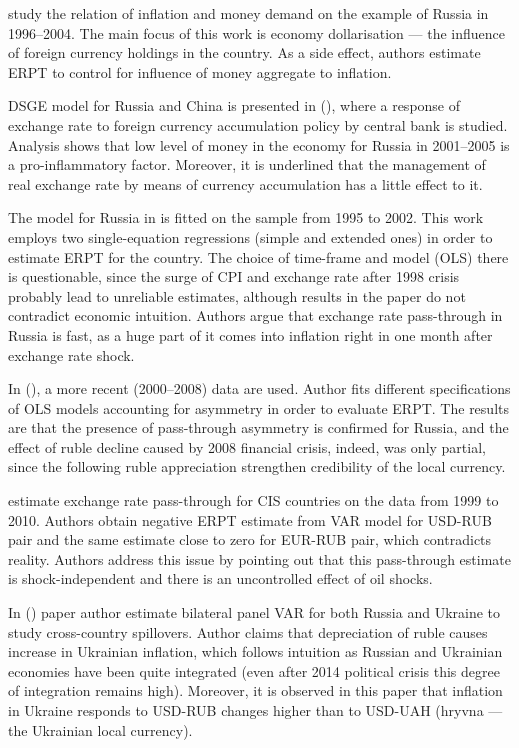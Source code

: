 \documentclass[12pt, a4paper]{extarticle}
\begin{document}
\textcite{Oomes2005} study the relation of inflation and money demand on the example of Russia in 1996--2004. The main focus of this work is economy dollarisation --- the influence of foreign currency holdings in the country. As a side effect, authors estimate ERPT to control for influence of money aggregate to inflation. 

DSGE model for Russia and China is presented in (\cite{Sosunov2006}), where a response of exchange rate to foreign currency accumulation policy by central bank is studied. Analysis shows that low level of money in the economy for Russia in 2001--2005 is a pro-inflammatory factor. Moreover, it is underlined that the management of real exchange rate by means of currency accumulation has a little effect to it.

The model for Russia in \cite{Dobrynskaya2008} is fitted on the sample from 1995 to 2002. This work employs two single-equation regressions (simple and extended ones) in order to estimate ERPT for the country. The choice of time-frame and model (OLS) there is questionable, since the surge of CPI and exchange rate after 1998 crisis probably lead to unreliable estimates, although results in the paper do not contradict economic intuition. Authors argue that exchange rate pass-through in Russia is fast, as a huge part of it comes into inflation right in one month after exchange rate shock.

In (\cite{Kataranova2010}), a more recent (2000--2008) data are used. Author fits different specifications of OLS models accounting for asymmetry in order to evaluate ERPT. The results are that the presence of pass-through asymmetry is confirmed for Russia, and the effect of ruble decline caused by 2008 financial crisis, indeed, was only partial, since the following ruble appreciation strengthen credibility of the local currency.

\textcite{Beckmann2013} estimate exchange rate pass-through for CIS countries on the data from 1999 to 2010. Authors obtain negative ERPT estimate from VAR model for USD-RUB pair and the same estimate close to zero for EUR-RUB pair, which contradicts reality. Authors address this issue by pointing out that this pass-through estimate is shock-independent and there is an uncontrolled effect of oil shocks.

In (\cite{Faryna2016}) paper author estimate bilateral panel VAR for both Russia and Ukraine to study cross-country spillovers. Author claims that depreciation of ruble causes increase in Ukrainian inflation, which follows intuition as Russian and Ukrainian economies have been quite integrated (even after 2014 political crisis this degree of integration remains high). Moreover, it is observed in this paper that inflation in Ukraine responds to USD-RUB changes higher than to USD-UAH (hryvna --- the Ukrainian local currency). 
\end{document}
